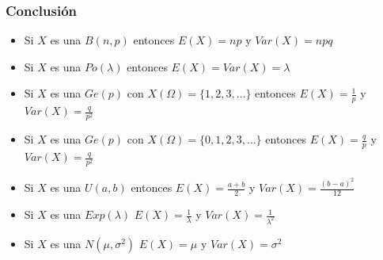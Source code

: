 \begin{frame}
\frametitle{Conclusión}
\begin{itemize}
\item Si $X$ es una $B(n,p)$ entonces $E(X)=np$ y $Var(X)=npq$
\item Si $X$ es una $Po(\lambda)$ entonces $E(X)=Var(X)=\lambda$
\item Si $X$ es una $Ge(p)$ con $X(\Omega)=\{1,2,3,\ldots\}$  entonces $E(X)=\frac{1}{p}$ y $Var(X)=\frac{q}{p^2}$
\item Si $X$ es una $Ge(p)$ con $X(\Omega)=\{0,1,2,3,\ldots\}$ entonces $E(X)=\frac{q}{p}$ y $Var(X)=\frac{q}{p^2}$
\item Si $X$ es una $U(a,b)$ entonces $E(X)=\frac{a+b}{2}$ y $Var(X)=\frac{(b-a)^2}{12}$
\item Si $X$ es una $Exp(\lambda)$ $E(X)=\frac{1}{\lambda}$ y $Var(X)=\frac{1}{\lambda^2}$
\item Si $X$ es una $N(\mu,\sigma^2)$ $E(X)=\mu$ y $Var(X)=\sigma^2$
\end{itemize}
\end{frame}

